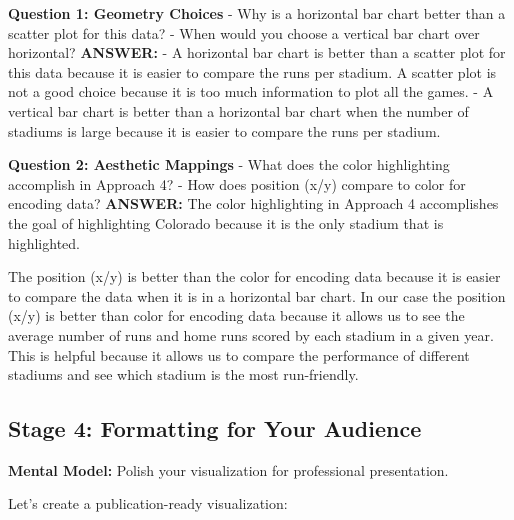 \documentclass[
  letterpaper,
  DIV=11,
  numbers=noendperiod]{scrartcl}
\begin{document}
\begin{tcolorbox}[enhanced jigsaw, rightrule=.15mm, coltitle=black, colbacktitle=quarto-callout-important-color!10!white, opacitybacktitle=0.6, arc=.35mm, leftrule=.75mm, colback=white, title=\textcolor{quarto-callout-important-color}{\faExclamation}\hspace{0.5em}{🤔 Discussion Questions: Stage 3 - Structuring of Visual Mappings}, colframe=quarto-callout-important-color-frame, bottomrule=.15mm, left=2mm, opacityback=0, toptitle=1mm, titlerule=0mm, toprule=.15mm, bottomtitle=1mm, breakable]

\textbf{Question 1: Geometry Choices} - Why is a horizontal bar chart
better than a scatter plot for this data? - When would you choose a
vertical bar chart over horizontal? \textbf{ANSWER:} - A horizontal bar
chart is better than a scatter plot for this data because it is easier
to compare the runs per stadium. A scatter plot is not a good choice
because it is too much information to plot all the games. - A vertical
bar chart is better than a horizontal bar chart when the number of
stadiums is large because it is easier to compare the runs per stadium.

\textbf{Question 2: Aesthetic Mappings} - What does the color
highlighting accomplish in Approach 4? - How does position (x/y) compare
to color for encoding data? \textbf{ANSWER:} The color highlighting in
Approach 4 accomplishes the goal of highlighting Colorado because it is
the only stadium that is highlighted.

The position (x/y) is better than the color for encoding data because it
is easier to compare the data when it is in a horizontal bar chart. In
our case the position (x/y) is better than color for encoding data
because it allows us to see the average number of runs and home runs
scored by each stadium in a given year. This is helpful because it
allows us to compare the performance of different stadiums and see which
stadium is the most run-friendly.

\end{tcolorbox}

\subsection{Stage 4: Formatting for Your
Audience}\label{stage-4-formatting-for-your-audience}

\textbf{Mental Model:} Polish your visualization for professional
presentation.

Let's create a publication-ready visualization:
\end{document}
